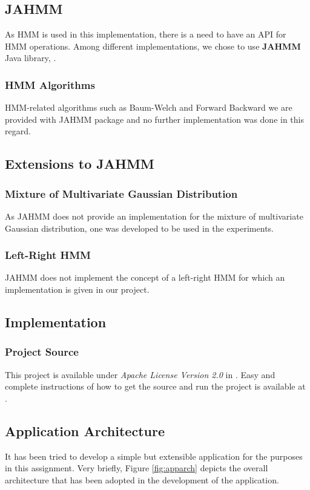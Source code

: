 \documentclass{acm_proc_article-sp}
\begin{document}
\subsection{JAHMM}
As HMM is used in this implementation, there is a need to have an API for HMM operations. Among different
implementations, we chose to use \textbf{JAHMM} Java library, \cite{jahmm}.

\subsubsection{HMM Algorithms}
HMM-related algorithms such as Baum-Welch and Forward Backward we are provided with JAHMM package and no further
implementation was done in this regard.

\subsection{Extensions to JAHMM}

\subsubsection{Mixture of Multivariate Gaussian Distribution}
As JAHMM does not provide an implementation for the mixture of multivariate Gaussian distribution, one was developed to
be used in the experiments.

\subsubsection{Left-Right HMM}
JAHMM does not implement the concept of a left-right HMM for which an implementation is given in our project.

\subsection{Implementation}

\subsubsection{Project Source}
This project is available under \textit{Apache License Version 2.0} in \cite{ftse}. Easy and complete instructions of
how to get the source and run the project is available at \cite{ftse:wiki}.

\subsection{Application Architecture}
It has been tried to develop a simple but extensible application for the purposes in this assignment. Very briefly,
Figure \ref{fig:apparch} depicts the overall architecture that has been adopted in the development of the application.
\end{document}
